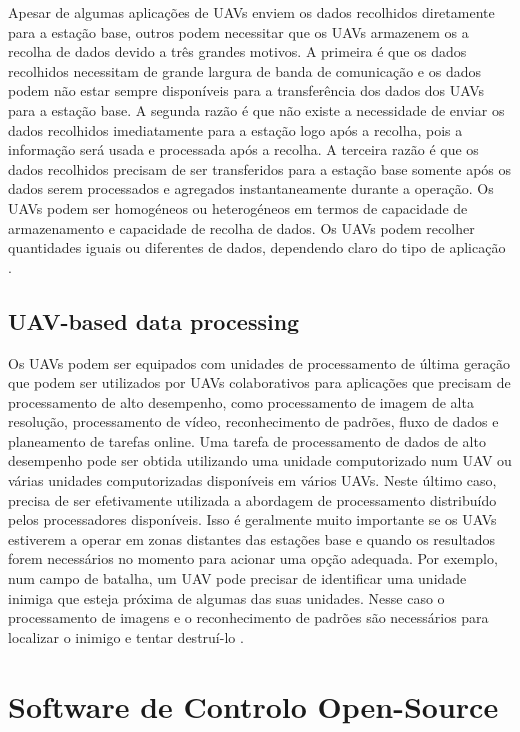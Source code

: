 Apesar de algumas aplicações de UAVs enviem os dados recolhidos diretamente para a estação base, outros podem necessitar que os UAVs armazenem os a recolha de dados devido a três grandes motivos. A primeira é que os dados recolhidos necessitam de grande largura de banda de comunicação e os dados podem não estar sempre disponíveis para a transferência dos dados dos UAVs para a estação base. A segunda razão é que não existe a necessidade de enviar os dados recolhidos imediatamente para a estação logo após a recolha, pois a informação será usada e processada após a recolha. A terceira razão é que os dados recolhidos precisam de ser transferidos para a estação base somente após os dados serem processados e agregados instantaneamente durante a operação. Os UAVs podem ser homogéneos ou heterogéneos em termos de capacidade de armazenamento e capacidade de recolha de dados. Os UAVs podem recolher quantidades iguais ou diferentes de dados, dependendo claro do tipo de aplicação \cite{ImadJawhar2017}.

\subsection{UAV-based data processing}

Os UAVs podem ser equipados com unidades de processamento de última geração que podem ser utilizados por UAVs colaborativos para aplicações que precisam de processamento de alto desempenho, como processamento de imagem de alta resolução, processamento de vídeo, reconhecimento de padrões, fluxo de dados e planeamento de tarefas online. Uma tarefa de processamento de dados de alto desempenho pode ser obtida utilizando uma unidade computorizado num UAV ou várias unidades computorizadas disponíveis em vários UAVs. Neste último caso, precisa de ser efetivamente utilizada a abordagem de processamento distribuído pelos processadores disponíveis. Isso é geralmente muito importante se os UAVs estiverem a operar em zonas distantes das estações base e quando os resultados forem necessários no momento para acionar uma opção adequada. Por exemplo, num campo de batalha, um UAV pode precisar de identificar uma unidade inimiga que esteja próxima de algumas das suas unidades. Nesse caso o processamento de imagens e o reconhecimento de padrões são necessários para localizar o inimigo e tentar destruí-lo \cite{ImadJawhar2017}.

\section{Software de Controlo Open-Source}\label{chap:cs_opensource}


